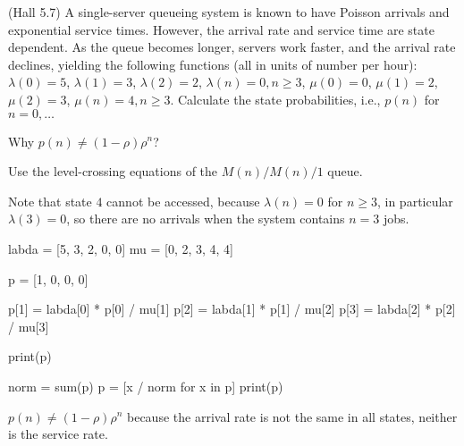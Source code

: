 \documentclass[companion]{subfiles}
\begin{document}
\begin{extra}
 (Hall 5.7) A single-server queueing system is known to have Poisson
 arrivals and exponential service times. However, the arrival rate
 and service time are state dependent. As the queue becomes longer,
 servers work faster, and the arrival rate declines, yielding the
 following functions (all in units of number per hour):
 $\lambda(0) = 5$, $\lambda(1)=3$, $\lambda(2)=2$,
 $\lambda(n)=0, n\geq 3$, $\mu(0) = 0$, $\mu(1)=2$, $\mu(2)=3$, $\mu(n)=4, n\geq 3$. 
 Calculate the state probabilities, i.e., $p(n)$ for $n=0,\ldots$

 Why  $p(n) \neq (1-\rho)\rho^n$?
\begin{hint}
Use the level-crossing equations of the $M(n)/M(n)/1$ queue. 
\end{hint}
\begin{solution}
  Note that state $4$ cannot be accessed, because $\lambda(n)=0$ for $n\geq 3$, in particular $\lambda(3)=0$, so there are no arrivals when the system contains $n=3$ jobs.

\begin{pyconsole}
labda = [5, 3, 2, 0, 0]
mu = [0, 2, 3, 4, 4]

p = [1, 0, 0, 0]

p[1] = labda[0] * p[0] / mu[1]
p[2] = labda[1] * p[1] / mu[2]
p[3] = labda[2] * p[2] / mu[3]

print(p)

norm = sum(p)
p = [x / norm for x in p]
print(p)
\end{pyconsole}


$p(n) \neq (1-\rho)\rho^n$ because the arrival rate is not the same in all states, neither is the service rate.


\end{solution}
\end{extra}
\end{document}
